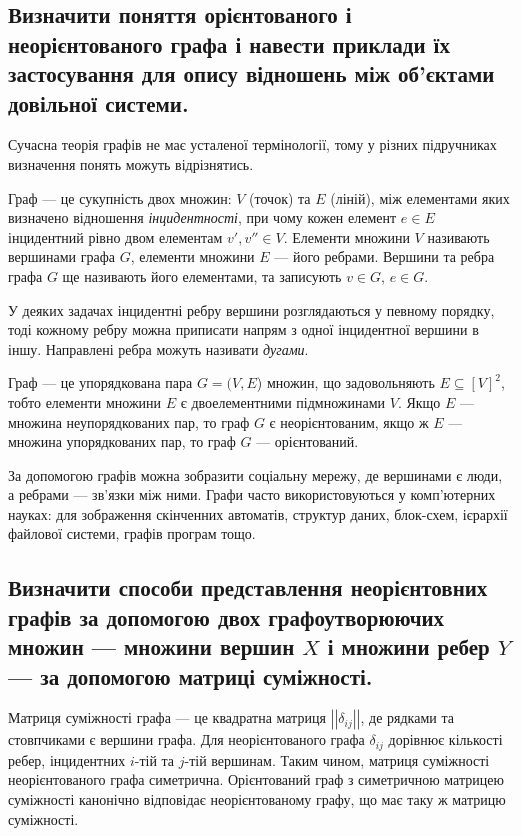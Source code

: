 \documentclass[a4paper,oneside,DIV=12,fontsize=12pt, headings=small]{scrartcl}
\begin{document}
		\subsection{Визначити поняття орієнтованого і неорієнтованого графа і навести приклади їх застосування для опису відношень між об'єктами довільної системи.}
			Сучасна теорія графів не має усталеної термінології, тому у різних підручниках визначення понять можуть відрізнятись.
			
			Граф --- це сукупність двох множин: $V$ (точок) та $E$ (ліній), між елементами яких визначено відношення \emph{інцидентності}, при чому кожен елемент $e \in E$ інцидентний рівно двом елементам $v', v'' \in V$. Елементи множини $V$ називають вершинами графа $G$, елементи множини $E$ --- його ребрами. Вершини та ребра графа $G$ ще називають його елементами, та записують $v \in G$, $e \in G$.
			
			У деяких задачах інцидентні ребру вершини розглядаються у певному порядку, тоді кожному ребру можна приписати напрям з одної інцидентної вершини в іншу. Направлені ребра можуть називати \emph{дугами}.
			
			Граф --- це упорядкована пара $G = (V, E$) множин, що задовольняють $E \subseteq \left[V\right]^2$, тобто елементи множини $E$ є двоелементними підмножинами $V$. Якщо $E$ --- множина неупорядкованих пар, то граф $G$ є неорієнтованим, якщо ж $E$ --- множина упорядкованих пар, то граф $G$ --- орієнтований.
			
			За допомогою графів можна зобразити соціальну мережу, де вершинами є люди, а ребрами --- зв'язки між ними. Графи часто використовуються у комп'ютерних науках: для зображення скінченних автоматів, структур даних, блок-схем, ієрархії файлової системи, графів програм тощо.
			
		\subsection{Визначити способи представлення неорієнтовних графів за допомогою двох графоутворюючих множин --- множини вершин $X$ і множини ребер $Y$ --- за допомогою матриці суміжності.}
			Матриця суміжності графа --- це квадратна матриця $\left|\left|\delta_{ij}\right|\right|$, де рядками та стовпчиками є вершини графа. Для неорієнтованого графа $\delta_{ij}$ дорівнює кількості ребер, інцидентних $i$-тій та $j$-тій вершинам. Таким чином, матриця суміжності неорієнтованого графа симетрична. Орієнтований граф з симетричною матрицею суміжності канонічно відповідає неорієнтованому графу, що має таку ж матрицю суміжності.
			
\end{document}
